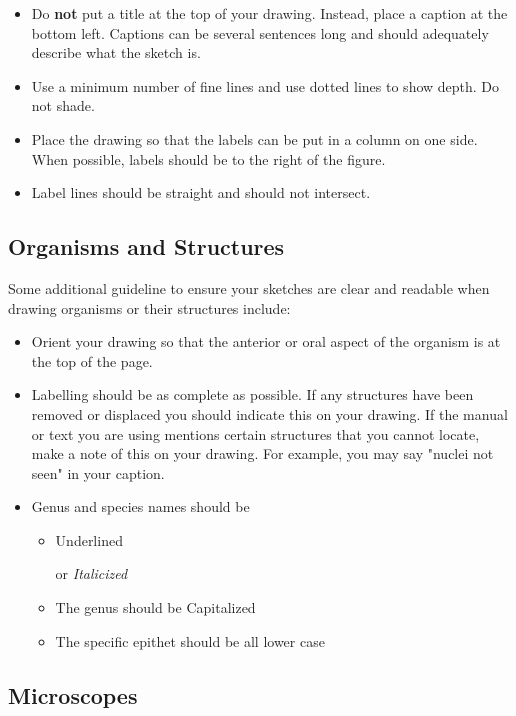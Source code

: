 \documentclass[
]{book}
\providecommand{\tightlist}{%
  \setlength{\itemsep}{0pt}\setlength{\parskip}{0pt}}
\begin{document}
\begin{itemize}
\tightlist
\item
  Do \textbf{not} put a title at the top of your drawing. Instead, place a caption at the bottom left. Captions can be several sentences long and should adequately describe what the sketch is.
\item
  Use a minimum number of fine lines and use dotted lines to show depth. Do not shade.
\item
  Place the drawing so that the labels can be put in a column on one side. When possible, labels should be to the right of the figure.
\item
  Label lines should be straight and should not intersect.
\end{itemize}

\subsection*{Organisms and Structures}\label{organisms-and-structures}

Some additional guideline to ensure your sketches are clear and readable when drawing organisms or their structures include:

\begin{itemize}
\tightlist
\item
  Orient your drawing so that the anterior or oral aspect of the organism is at the top of the page.
\item
  Labelling should be as complete as possible. If any structures have been removed or displaced you should indicate this on your drawing. If the manual or text you are using mentions certain structures that you cannot locate, make a note of this on your drawing. For example, you may say "nuclei not seen" in your caption.
\item
  Genus and species names should be

  \begin{itemize}
  \item
    Underlined

    or \emph{Italicized}
  \item
    The genus should be Capitalized
  \item
    The specific epithet should be all lower case
  \end{itemize}
\end{itemize}

\subsection*{Microscopes}\label{microscopes}
\end{document}
